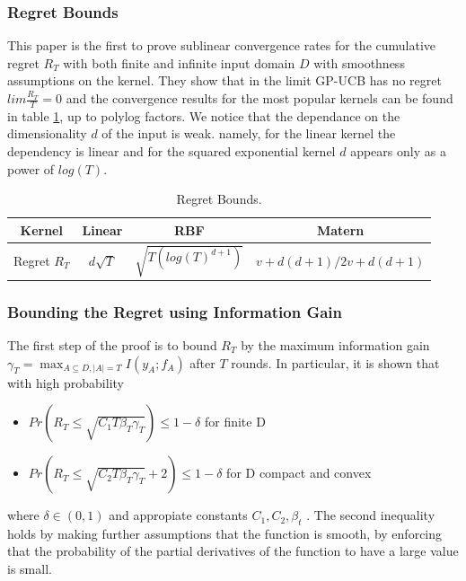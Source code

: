 \documentclass[10pt,journal,a4paper]{IEEEtran}
\begin{document}
\subsubsection{Regret Bounds}

This paper is the first to prove sublinear convergence rates for the cumulative regret $R_T$ with both finite and infinite input domain $D$ with smoothness assumptions on the kernel. They show that in the limit GP-UCB has no regret $lim \frac{R_T}{T}= 0$ and the convergence results for the most popular kernels can be found in table \ref{bounds}, up to polylog factors. We notice that the dependance on the dimensionality $d$ of the input is weak. namely, for the linear kernel the dependency is linear and for the squared exponential kernel $d$ appears only as a power of $log(T)$.
\begin{table}
\begin{tabular}{|c||c|c|c|}
\hline
Kernel & Linear & RBF & Matern\\
\hline
Regret $R_T$ & $d\sqrt{T}$& $\sqrt{T(log(T)^{d+1})} $ &${v+d(d+1)/2v+d(d+1)}$\\
\hline
\end{tabular}
\label{bounds}
\caption{Regret Bounds.}
\end{table}


\subsubsection{Bounding the Regret using Information Gain}
The first step of the proof is to bound $R_T$ by the maximum information gain $\gamma_T = \max_{A \subseteq D, |A| = T} I(y_A;f_A)$ after $T$ rounds.
In particular, it is shown that with high probability
\begin{itemize}
\item $Pr(R_T \leq \sqrt{C_1T\beta_T\gamma_T}) \leq 1- \delta$ for finite D
\item$Pr(R_T \leq \sqrt{C_2T\beta_T\gamma_T} + 2) \leq 1- \delta$ for  D compact and convex 
\end{itemize}
where $\delta \in (0,1)$ and appropiate constants $C_1, C_2, \beta_t$ . The second inequality holds by making further assumptions that the function is smooth, by enforcing that the probability of the partial derivatives of the function to have a large value is small.
\end{document}
